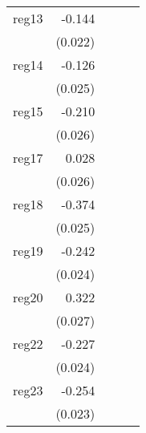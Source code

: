 {\begin{longtable}{l*{4}{D{.}{.}{-1}}}
\addlinespace
reg13       &      -0.144\sym{***}&                     &                     &                     \\
            &     (0.022)         &                     &                     &                     \\
\addlinespace
reg14       &      -0.126\sym{***}&                     &                     &                     \\
            &     (0.025)         &                     &                     &                     \\
\addlinespace
reg15       &      -0.210\sym{***}&                     &                     &                     \\
            &     (0.026)         &                     &                     &                     \\
\addlinespace
reg17       &       0.028         &                     &                     &                     \\
            &     (0.026)         &                     &                     &                     \\
\addlinespace
reg18       &      -0.374\sym{***}&                     &                     &                     \\
            &     (0.025)         &                     &                     &                     \\
\addlinespace
reg19       &      -0.242\sym{***}&                     &                     &                     \\
            &     (0.024)         &                     &                     &                     \\
\addlinespace
reg20       &       0.322\sym{***}&                     &                     &                     \\
            &     (0.027)         &                     &                     &                     \\
\addlinespace
reg22       &      -0.227\sym{***}&                     &                     &                     \\
            &     (0.024)         &                     &                     &                     \\
\addlinespace
reg23       &      -0.254\sym{***}&                     &                     &                     \\
            &     (0.023)         &                     &                     &                     \\

\end{longtable}}
